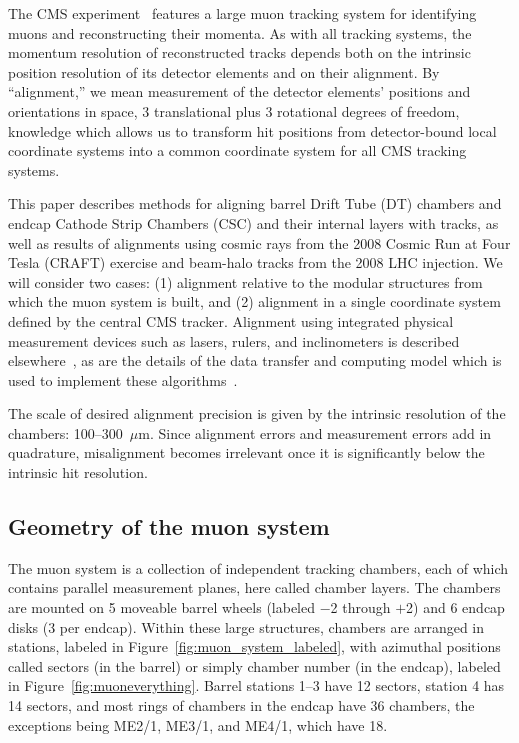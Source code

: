  

The CMS experiment~\cite{ref:cms} features a large muon tracking system for
identifying muons and reconstructing their momenta.  As with all
tracking systems, the momentum resolution of reconstructed tracks depends both
on the intrinsic position resolution of its detector elements and on their
alignment.  By ``alignment,'' we mean measurement of the detector
elements' positions and orientations in space, 3 translational plus 3
rotational degrees of freedom, knowledge which allows us to transform
hit positions from detector-bound local coordinate systems into a
common coordinate system for all CMS tracking systems.

This paper describes methods for aligning barrel Drift Tube (DT)
chambers and endcap Cathode Strip Chambers (CSC) and their internal
layers with tracks, as well as results of alignments using cosmic rays
from the 2008 Cosmic Run at Four Tesla (CRAFT) exercise
and beam-halo tracks from the 2008 LHC injection.  We will consider two
cases: (1) alignment relative to the modular structures from which the
muon system is built, and (2) alignment in a single coordinate system
defined by the central CMS tracker.  Alignment using integrated
physical measurement devices such as lasers, rulers, and
inclinometers is described elsewhere~\cite{ref:hardware_alignment}, as
are the details of the data transfer and computing model which is used
to implement these algorithms~\cite{ref:workflow}.

The scale of desired alignment precision is given by the intrinsic
resolution of the chambers: 100--300~$\mu$m.  Since alignment errors
and measurement errors add in quadrature, misalignment becomes
irrelevant once it is significantly below the intrinsic hit
resolution.

\subsection{Geometry of the muon system}

The muon system is a collection of independent tracking chambers, each
of which contains parallel measurement planes, here called chamber
layers.  The chambers are mounted on 5 moveable barrel wheels (labeled
$-$2 through $+$2) and 6 endcap disks (3 per endcap).  Within these
large structures, chambers are arranged in stations, labeled in
Figure~\ref{fig:muon_system_labeled}, with azimuthal positions called
sectors (in the barrel) or simply chamber number (in the endcap),
labeled in Figure~\ref{fig:muoneverything}.  Barrel stations 1--3 have
12 sectors, station 4 has 14 sectors, and most rings of chambers in
the endcap have 36 chambers, the exceptions being ME2/1, ME3/1, and
ME4/1, which have 18.

